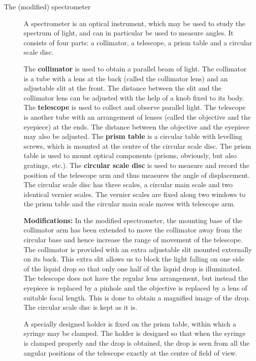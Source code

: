 \begin{description}
    \item[The (modified) spectrometer]

    A spectrometer is an optical instrument, which may be used to study the spectrum of light, and can in particular be used to measure angles. It consists of four parts: a collimator, a telescope, a prism table and a circular scale disc.

    The \textbf{collimator} is used to obtain a parallel beam of light. The collimator is a tube with a lens at the back (called the collimator lens) and an adjustable slit at the front. The distance between the slit and the collimator lens can be adjusted with the help of a knob fixed to its body. The \textbf{telescope} is used to collect and observe parallel light. The telescope is another tube with an arrangement of lenses (called the objective and the eyepiece) at the ends. The distance between the objective and the eyepiece may also be adjusted. The \textbf{prism table} is a circular table with levelling screws, which is mounted at the centre of the circular scale disc. The prism table is used to mount optical components (prisms, obviously, but also gratings, etc.).  The \textbf{circular scale disc} is used to measure and record the position of the telescope arm and thus measures the angle of displacement. The circular scale disc has three scales, a circular main scale and two identical vernier scales. The vernier scales are fixed along two windows to the prism table and the circular main scale moves with telescope arm.  

    \textbf{Modifications:} In the modified spectrometer, the mounting base of the collimator arm has been extended to move the collimator away from the circular base and hence increase the range of movement of the telescope. The collimator is provided with an extra adjustable slit mounted externally on its back. This extra slit allows us to block the light falling on one side of the liquid drop so that only one half of the liquid drop is illuminated. The telescope does not have the regular lens arrangement, but instead the eyepiece is replaced by a pinhole and the objective is replaced by a lens of suitable focal length. This is done to obtain a magnified image of the drop. The circular scale disc is kept as it is. 

    A specially designed holder is fixed on the prism table, within which a syringe may be clamped. The holder is designed so that when the syringe is clamped properly and the drop is obtained, the drop is seen from all the angular positions of the telescope exactly at the centre of field of view. 


\end{description}
